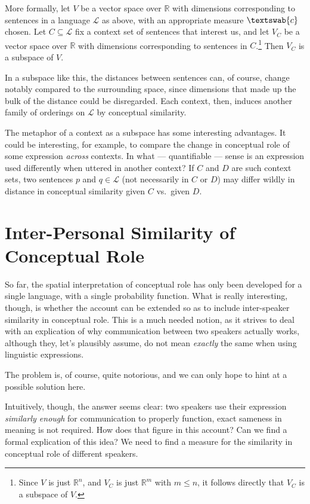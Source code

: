 \documentclass[11pt, a4paper]{scrartcl}
\renewcommand{\i}[1]{\emph{#1}}
\renewcommand{\L}{\mathcal{L}}
\newcommand{\m}[1]{\textswab{#1}}
\begin{document}
More formally, let $V$ be a vector space over $\mathbb{R}$ with dimensions corresponding to sentences in a language $\L$ as above, with an appropriate measure $\m{c}$ chosen. Let $C \subseteq \L$ fix a context set of sentences that interest us, and let $V_C$ be a vector space over $\mathbb{R}$ with dimensions corresponding to sentences in $C$.\footnote{Since $V$ is just $\mathbb{R}^n$, and $V_C$ is just $\mathbb{R}^m$ with $m \leqslant n$, it follows directly that $V_C$ is a subspace of $V$.} Then $V_C$ is a subspace of $V$.

In a subspace like this, the distances between sentences can, of course, change notably compared to the surrounding space, since dimensions that made up the bulk of the distance could be disregarded. Each context, then, induces another family of orderings on $\L$ by conceptual similarity.

The metaphor of a context as a subspace has some interesting advantages. It could be interesting, for example, to compare the change in conceptual role of some expression \i{across} contexts. In what --- quantifiable --- sense is an expression used differently when uttered in another context? If $C$ and $D$ are such context sets, two sentences $p$ and $q \in \L$  (not necessarily in $C$ or $D$) may differ wildly in distance in conceptual similarity given $C$ vs.\ given $D$. 

\section{Inter-Personal Similarity of Conceptual Role}

So far, the spatial interpretation of conceptual role has only been developed for a single language, with a single probability function. What is really interesting, though, is whether the account can be extended so as to include inter-speaker similarity in conceptual role. This is a much needed notion, as it strives to deal with an explication of why communication between two speakers actually works, although they, let's plausibly assume, do not mean \i{exactly} the same when using linguistic expressions. 

The problem is, of course, quite notorious, and we can only hope to hint at a possible solution here.

Intuitively, though, the answer seems clear: two speakers use their expression \i{similarly enough} for communication to properly function, exact sameness in meaning is not required. How does that figure in this account? Can we find a formal explication of this idea? We need to find a measure for the similarity in conceptual role of different speakers. 
\end{document}
